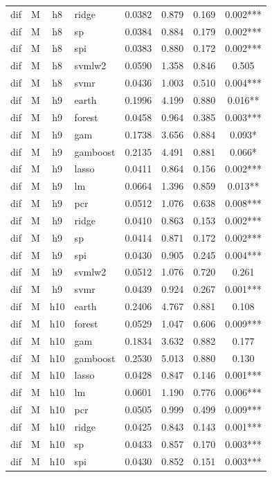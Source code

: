 \begin{ThreePartTable}
\begin{longtable}[t]{llclcccc}
dif & M & h8 & ridge & 0.0382 & 0.879 & 0.169 & 0.002***\\
dif & M & h8 & sp & 0.0384 & 0.884 & 0.179 & 0.002***\\
dif & M & h8 & spi & 0.0383 & 0.880 & 0.172 & 0.002***\\
dif & M & h8 & svmlw2 & 0.0590 & 1.358 & 0.846 & 0.505\\
dif & M & h8 & svmr & 0.0436 & 1.003 & 0.510 & 0.004***\\
\addlinespace
dif & M & h9 & earth & 0.1996 & 4.199 & 0.880 & 0.016**\\
dif & M & h9 & forest & 0.0458 & 0.964 & 0.385 & 0.003***\\
dif & M & h9 & gam & 0.1738 & 3.656 & 0.884 & 0.093*\\
dif & M & h9 & gamboost & 0.2135 & 4.491 & 0.881 & 0.066*\\
dif & M & h9 & lasso & 0.0411 & 0.864 & 0.156 & 0.002***\\
dif & M & h9 & lm & 0.0664 & 1.396 & 0.859 & 0.013**\\
dif & M & h9 & pcr & 0.0512 & 1.076 & 0.638 & 0.008***\\
dif & M & h9 & ridge & 0.0410 & 0.863 & 0.153 & 0.002***\\
dif & M & h9 & sp & 0.0414 & 0.871 & 0.172 & 0.002***\\
dif & M & h9 & spi & 0.0430 & 0.905 & 0.245 & 0.004***\\
dif & M & h9 & svmlw2 & 0.0512 & 1.076 & 0.720 & 0.261\\
dif & M & h9 & svmr & 0.0439 & 0.924 & 0.267 & 0.001***\\
\addlinespace
dif & M & h10 & earth & 0.2406 & 4.767 & 0.881 & 0.108\\
dif & M & h10 & forest & 0.0529 & 1.047 & 0.606 & 0.009***\\
dif & M & h10 & gam & 0.1834 & 3.632 & 0.882 & 0.177\\
dif & M & h10 & gamboost & 0.2530 & 5.013 & 0.880 & 0.130\\
dif & M & h10 & lasso & 0.0428 & 0.847 & 0.146 & 0.001***\\
dif & M & h10 & lm & 0.0601 & 1.190 & 0.776 & 0.006***\\
dif & M & h10 & pcr & 0.0505 & 0.999 & 0.499 & 0.009***\\
dif & M & h10 & ridge & 0.0425 & 0.843 & 0.143 & 0.001***\\
dif & M & h10 & sp & 0.0433 & 0.857 & 0.170 & 0.003***\\
dif & M & h10 & spi & 0.0430 & 0.852 & 0.151 & 0.003***\\

\end{longtable}
\end{ThreePartTable}
